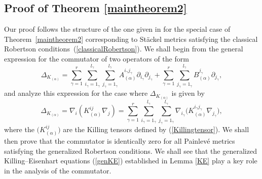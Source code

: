 \documentclass[pdftex]{sigma}
\numberwithin{equation}{section}
\newcommand{\igamma}{i_{\gamma}}
\newcommand{\jgamma}{j_{\gamma}}
\begin{document}
\subsection{Proof of Theorem \ref{maintheorem2}}
Our proof follows the structure of the one given in \cite{BCR2-2002} for the special case of Theorem~\ref{maintheorem2} corresponding to St\"ackel metrics satisfying the classical Robertson conditions~(\ref{classicalRobertson}). We shall begin from the general expression for the commutator of two operators of the form
\[
\Delta_{K_{(\alpha)}}=\sum_{\gamma=1}^{r}\sum_{i_{\gamma}=1_{\gamma}}^{l_{\gamma}}\sum_{j_{\gamma}=1_{\gamma}}^{l_{\gamma}}A_{(\alpha)}^{\igamma \jgamma}\partial_{\igamma}\partial_{\jgamma}+\sum_{\gamma=1}^{r}\sum_{j_{\gamma}=1_{\gamma}}^{l_{\gamma}}B_{(\alpha)}^{\jgamma}\partial_{\jgamma},
\]
and analyze this expression for the case where $\Delta_{K_{(\alpha)}}$ is given by
\[
\Delta_{K_{(\alpha)}}=\nabla_{i}(K_{(\alpha)}^{ij}\nabla_{j})=\sum_{\gamma=1}^{r}\sum_{i_{\gamma}=1_{\gamma}}^{l_{\gamma}}\sum_{j_{\gamma} =1_{\gamma}}^{l_{\gamma}}\nabla_{i_{\gamma}}\big(K_{(\alpha)}^{i_{\gamma}j_{\gamma}}\nabla_{j_{\gamma}}\big),
\]
where the $\big(K_{(\alpha)}^{ij}\big)$ are the Killing tensors defined by (\ref{Killingtensor}). We shall then prove that the commutator is identically zero for all Painlev\'e metrics satisfying the generalized Robertson conditions. We shall see that the generalized Killing--Eisenhart equations (\ref{genKE}) established in Lemma \ref{KE} play a key role in the analysis of the commutator.
\end{document}
